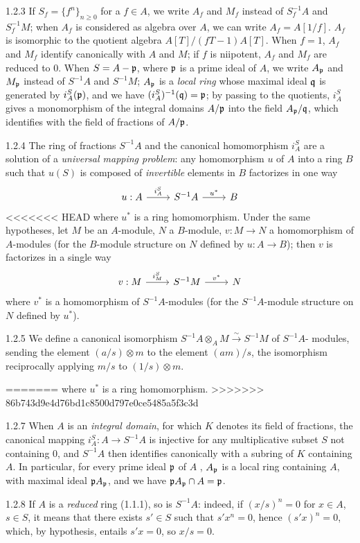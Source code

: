 \documentclass[../main.tex]{subfiles}
\begin{document}
\begin{cx}{1.2.3}
If $S_f=\{f^n\}_{n\geq 0}$ for a $f\in A$, we write $A_f$ and $M_f$ instead of $S_f^{-1}A$ and $S_f^{-1}M$; when $A_f$ is
considered as algebra over $A$, we can write $A_f=A[1/f]$. $A_f$ is isomorphic to the quotient algebra $A[T]/(fT-1)A[T]$.
When $f=1$, $A_f$ and $M_f$ identify canonically with $A$ and $M$; if $f$ is niipotent, $A_f$ and $M_f$ are reduced to $0$.
When $S=A-\mathfrak{p}$, where $\mathfrak{p}$ is a prime ideal of $A$, we write $A_\mathfrak{p}$ and $M_\mathfrak{p}$ instead of $S^{-1}A$ and $S^{-1}M$;
$A_\mathfrak{p}$ is a \emph{local ring} whose maximal ideal $\mathfrak{q}$ is generated by $i_A^S(\mathfrak{p})$, and we have
$(i_A^S)^{-1}(\mathfrak{q})=\mathfrak{p}$; by passing to the quotients, $i_A^S$ gives a monomorphism of the integral domains $A/\mathfrak{p}$ into the
field $A_\mathfrak{p}/\mathfrak{q}$, which identifies with the field of fractions of $A/\mathfrak{p}$.
\end{cx}

\begin{cx}{1.2.4}
The ring of fractions $S^{-1}A$ and the canonical homomorphism $i_A^S$ are a solution of a \emph{universal mapping problem}:
any homomorphism $u$ of $A$ into a ring $B$ such that $u(S)$ is composed of \emph{invertible} elements in $B$ factorizes in
one way
\[
\begin{tikzcd}
  u:A\ar[r,"i_A^S"] & S^{-1}A\ar[r,"u^\ast"] & B
\end{tikzcd}
\]
<<<<<<< HEAD
where $u^\ast$ is a ring homomorphism. Under the same hypotheses, let $M$ be an
$A$-module, $N$ a $B$-module, $v:M\to N$ a homomorphism of $A$-modules (for the
$B$-module structure on $N$ defined by $u:A\to B$); then $v$ is factorizes in a single
way
\[
\begin{tikzcd}
  v:M\ar[r,"i_M^S"] & S^{-1}M\ar[r,"v^\ast"] & N
\end{tikzcd}
\]
where $v^\ast$ is a homomorphism of $S^{-1}A$-modules (for the $S^{-1}A$-module structure 
on $N$ defined by $u^\ast$).
\end{cx}

\begin{cx}{1.2.5}
We define a canonical isomorphism $S^{-1}A\otimes_A M\xrightarrow{\sim} S^{-1}M$ of $S^{-1}A$-
modules, sending the element $(a/s)\otimes m$ to the element $(am)/s$, the isomorphism
reciprocally applying $m/s$ to $(1/s)\otimes m$.
\end{cx}
=======
where $u^\ast$ is a ring homomorphism. 
>>>>>>> 86b743d9e4d76bd1c8500d797e0ce5485a5f3c3d

\begin{cx}{1.2.7}
When $A$ is an \emph{integral domain}, for which $K$ denotes its field of fractions, the canonical mapping $i_A^S:A\to S^{-1}A$
is injective for any multiplicative subset $S$ not containing $0$, and $S^{-1}A$ then identifies canonically with a subring of $K$
containing $A$. In particular, for every prime ideal $\mathfrak{p}$ of $A$ , $A_\mathfrak{p}$ is a local ring containing $A$,
with maximal ideal $\mathfrak{p}A_\mathfrak{p}$, and we have $\mathfrak{p}A_\mathfrak{p}\cap A=\mathfrak{p}$.
\end{cx}

\begin{cx}{1.2.8}
If $A$ is a \emph{reduced} ring (1.1.1), so is $S^{-1}A$: indeed, if $(x/s)^n=0$ for $x\in A$, $s\in S$, it means that
there exists $s'\in S$ such that $s'x^n=0$, hence $(s'x)^n=0$, which, by hypothesis, entails $s'x=0$, so $x/s=0$.
\end{cx}
\end{document}
